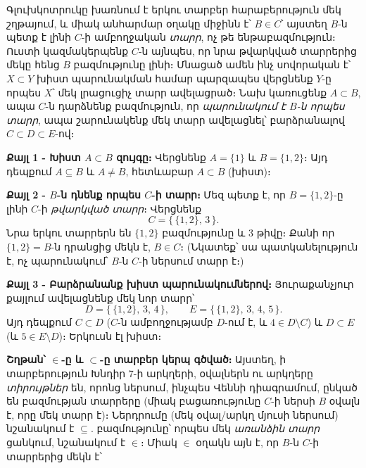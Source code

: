 \documentclass[11pt,a4paper]{article}
\begin{document}
\begin{ideabox}
Գլուխկոտրուկը խառնում է երկու տարբեր հարաբերություն մեկ շղթայում, և միակ անհարմար օղակը միջինն է՝
$B\in C$՝ այստեղ $B$-ն պետք է լինի $C$-ի ամբողջական \emph{տարր}, ոչ թե ենթաբազմություն։ Ուստի
կազմակերպենք $C$-ն այնպես, որ նրա թվարկված տարրերից մեկը հենց $B$ բազմությունը լինի։ Մնացած ամեն ինչ
սովորական է՝ $X\subset Y$ խիստ պարունակման համար պարզապես վերցնենք $Y$-ը որպես $X$՝ մեկ լրացուցիչ տարր
ավելացրած։ Նախ կառուցենք $A\subset B$, ապա $C$-ն դարձնենք բազմություն, որ \emph{պարունակում է $B$-ն որպես
տարր}, ապա շարունակենք մեկ տարր ավելացնել՝ բարձրանալով $C\subset D\subset E$-ով։
\end{ideabox}

\textbf{Քայլ 1 - Խիստ $A\subset B$ զույգը։}
Վերցնենք $A=\{1\}$ և $B=\{1,2\}$։ Այդ դեպքում $A\subseteq B$ և $A\neq B$, հետևաբար $A\subset B$ (խիստ)։ \checkmark

\textbf{Քայլ 2 - $B$-ն դնենք որպես $C$-ի տարր։}
Մեզ պետք է, որ $B=\{1,2\}$-ը լինի $C$-ի \emph{թվարկված տարր}։ Վերցնենք
$$C=\{\,\{1,2\},\,3\,\}.$$
Նրա երկու տարրերն են $\{1,2\}$ բազմությունը և $3$ թիվը։ Քանի որ $\{1,2\}=B$-ն դրանցից մեկն է,
$B\in C$։ \checkmark
(Նկատեք՝ սա պատկանելություն է, ոչ պարունակում՝ $B$-ն $C$-ի ներսում տարր է։)

\textbf{Քայլ 3 - Բարձրանանք խիստ պարունակումներով։}
Յուրաքանչյուր քայլում ավելացնենք մեկ նոր տարր՝
$$D=\{\,\{1,2\},\,3,\,4\,\},\qquad E=\{\,\{1,2\},\,3,\,4,\,5\,\}.$$
Այդ դեպքում $C\subset D$ ($C$-ն ամբողջությամբ $D$-ում է, և $4\in D\setminus C$) և $D\subset E$ (և
$5\in E\setminus D$)։ Երկուսն էլ խիստ։ \checkmark

\textbf{Շղթան՝ $\in$-ը և $\subset$-ը տարբեր կերպ գծված։} Այստեղ, ի տարբերություն Խնդիր 7-ի արկղերի, օվալներն ու արկղերը \emph{տիրույթներ} են,
որոնց ներսում, ինչպես Վեննի դիագրամում, ընկած են բազմության տարրերը (միակ բացառությունը $C$-ի ներսի
$B$ օվալն է, որը մեկ տարր է)։ Ներդրումը (մեկ օվալ/արկղ մյուսի ներսում)
նշանակում է $\subseteq$. բազմությունը՝ որպես մեկ \emph{առանձին տարր} ցանկում, նշանակում է $\in$։ Միակ
$\in$ օղակն այն է, որ $B$-ն $C$-ի տարրերից մեկն է՝
\end{document}
